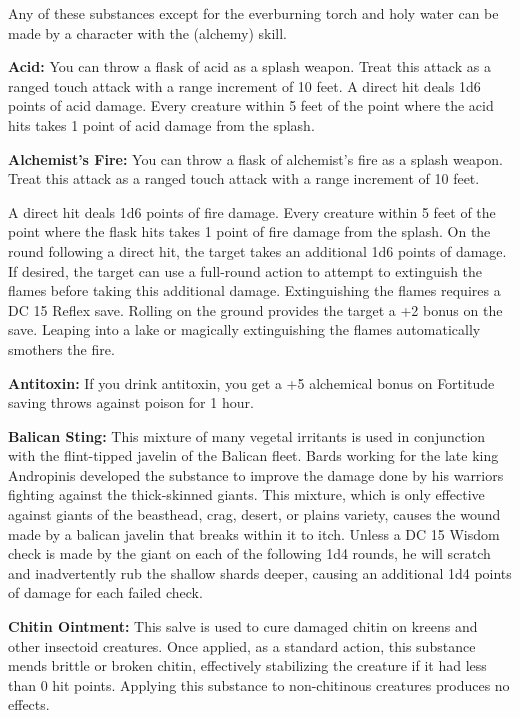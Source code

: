 Any of these substances except for the everburning torch and holy water can be made by a character with the  (alchemy) skill.


\textbf{Acid:} You can throw a flask of acid as a splash weapon. Treat this attack as a ranged touch attack with a range increment of 10 feet. A direct hit deals 1d6 points of acid damage. Every creature within 5 feet of the point where the acid hits takes 1 point of acid damage from the splash.

\textbf{Alchemist's Fire:} You can throw a flask of alchemist's fire as a splash weapon. Treat this attack as a ranged touch attack with a range increment of 10 feet.

A direct hit deals 1d6 points of fire damage. Every creature within 5 feet of the point where the flask hits takes 1 point of fire damage from the splash. On the round following a direct hit, the target takes an additional 1d6 points of damage. If desired, the target can use a full-round action to attempt to extinguish the flames before taking this additional damage. Extinguishing the flames requires a DC 15 Reflex save. Rolling on the ground provides the target a +2 bonus on the save. Leaping into a lake or magically extinguishing the flames automatically smothers the fire.

\textbf{Antitoxin:} If you drink antitoxin, you get a +5 alchemical bonus on Fortitude saving throws against poison for 1 hour.

\textbf{Balican Sting:} This mixture of many vegetal irritants is used in conjunction with the flint-tipped javelin of the Balican fleet. Bards working for the late king Andropinis developed the substance to improve the damage done by his warriors fighting against the thick-skinned giants. This mixture, which is only effective against giants of the beasthead, crag, desert, or plains variety, causes the wound made by a balican javelin that breaks within it to itch. Unless a DC 15 Wisdom check is made by the giant on each of the following 1d4 rounds, he will scratch and inadvertently rub the shallow shards deeper, causing an additional 1d4 points of damage for each failed check.

\textbf{Chitin Ointment:} This salve is used to cure damaged chitin on kreens and other insectoid creatures. Once applied, as a standard action, this substance mends brittle or broken chitin, effectively stabilizing the creature if it had less than 0 hit points. Applying this substance to non-chitinous creatures produces no effects.

